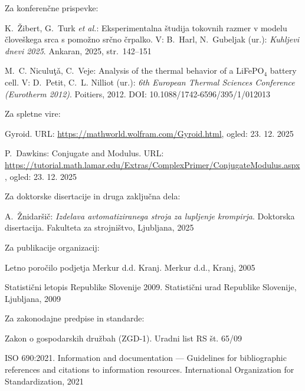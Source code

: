 Za konferenčne prispevke:
\begin{vzorecreferenc}
\item K.~Žibert, G.~Turk \emph{et al.}: Eksperimentalna študija tokovnih razmer v modelu človeškega srca s pomožno srčno črpalko. V: B.~Harl, N.~Gubeljak (ur.): \emph{Kuhljevi dnevi 2025}. Ankaran, 2025, str.~142--151
\item M.~C. Niculuţǎ, C.~Veje: Analysis of the thermal behavior of a LiFePO$_4$ battery cell. V: D.~Petit, C.~L. Nilliot (ur.): \emph{6th European Thermal Sciences Conference (Eurotherm 2012)}. Poitiers, 2012. DOI: 10.1088/1742-6596/395/1/012013
\end{vzorecreferenc}

Za spletne vire:
\begin{vzorecreferenc}
\item Gyroid. URL: \url{https://mathworld.wolfram.com/Gyroid.html}, ogled: 23. 12. 2025
\item P.~Dawkins: Conjugate and Modulus. URL: \url{https://tutorial.math.lamar.edu/Extras/ComplexPrimer/ConjugateModulus.aspx}, ogled: 23. 12. 2025
\end{vzorecreferenc}

Za doktorske disertacije in druga zaključna dela:
\begin{vzorecreferenc}
\item A.~Žnidaršič: \emph{Izdelava avtomatiziranega stroja za lupljenje krompirja}. Doktorska disertacija. Fakulteta za strojništvo, Ljubljana, 2025
\end{vzorecreferenc}

Za publikacije organizacij:
\begin{vzorecreferenc}
\item Letno poročilo podjetja Merkur d.d. Kranj. Merkur d.d., Kranj, 2005
\item Statistični letopis Republike Slovenije 2009. Statistični urad Republike Slovenije, Ljubljana, 2009
\end{vzorecreferenc}

Za zakonodajne predpise in standarde:
\begin{vzorecreferenc}
\item Zakon o gospodarskih družbah (ZGD-1). Uradni list RS št. 65/09
\item ISO 690:2021. Information and documentation --- Guidelines for bibliographic references and citations to information resources. International Organization for Standardization, 2021
\end{vzorecreferenc}
